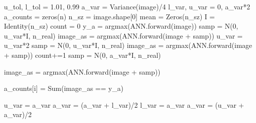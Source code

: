 \begin{algorithm}
\begin{algorithmic}
 \State u\_tol, l\_tol = 1.01, 0.99
 \State a\_var = Variance(image)/4 
 \State l\_var, u\_var  = 0, a\_var*2
 \State a\_counts = zeros(n)
 \State n\_sz = image.shape[0]
 \State mean = Zeros(n\_sz)
 \State I = Identity(n\_sz)
 \State count = 0
\State y\_a = argmax(ANN.forward(image))
\State samp = N(0, u\_var*I, n\_real)
\State image\_as = argmax(ANN.forward(image + samp))
\State u\_var = u\_var*2
\State samp = N(0, u\_var*I, n\_real)
\State image\_as = argmax(ANN.forward(image + samp))
\EndWhile
\State count+=1
\State samp = N(0, a\_var*I, n\_real)

\State image\_as = argmax(ANN.forward(image + samp))

\State a\_counts[i] = Sum(image\_as == y\_a)


     
        \State u\_var = a\_var
        \State a\_var = (a\_var + l\_var)/2
     
        \State l\_var = a\_var
        \State a\_var = (u\_var + a\_var)/2
        \EndIf
\EndFor

\EndFunction
\end{algorithmic}
\end{algorithm}
